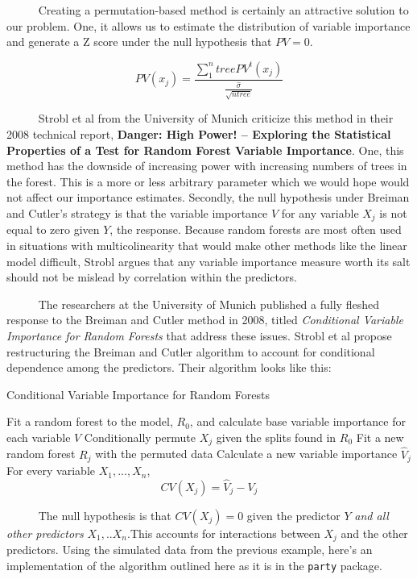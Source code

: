 \documentclass[12pt,twoside]{reedthesis}
\begin{document}
  ~~~~~ Creating a permutation-based method is certainly an attractive
  solution to our problem. One, it allows us to estimate the distribution
  of variable importance and generate a Z score under the null hypothesis
  that \(PV = 0\).
  
  \[PV(x_j) = \frac{\sum_1^ntree PV^t(x_j)}{\frac{\hat{\sigma}}{\sqrt{ntree}}}\]
  
  ~~~~~ Strobl et al from the University of Munich criticize this method
  in their 2008 technical report, \textbf{Danger: High Power! -- Exploring
  the Statistical Properties of a Test for Random Forest Variable
  Importance}. One, this method has the downside of increasing power with
  increasing numbers of trees in the forest. This is a more or less
  arbitrary parameter which we would hope would not affect our importance
  estimates. Secondly, the null hypothesis under Breiman and Cutler's
  strategy is that the variable importance \(V\) for any variable \(X_j\)
  is not equal to zero given \(Y\), the response. Because random forests
  are most often used in situations with multicolinearity that would make
  other methods like the linear model difficult, Strobl argues that any
  variable importance measure worth its salt should not be mislead by
  correlation within the predictors.
  
  ~~~~~ The researchers at the University of Munich published a fully
  fleshed response to the Breiman and Cutler method in 2008, titled
  \emph{Conditional Variable Importance for Random Forests} that address
  these issues. Strobl et al propose restructuring the Breiman and Cutler
  algorithm to account for conditional dependence among the predictors.
  Their algorithm looks like this:
  
  \begin{algorithm}
  \caption{Conditional Variable Importance for Random Forests}
  \label{cviRF}
  \begin{algorithmic}[1]
  \State Fit a random forest to the model, $R_0$, and calculate base variable importance for each variable $V$ 
  \State Conditionally permute $X_j$ given the splits found in $R_0$
  \State Fit a new random forest $R_j$ with the permuted data
  \State Calculate a new variable importance $\hat{V}_j$
  \EndFor
  \State For every variable $X_1,..., X_n$, $$CV(X_j) = \hat{V}_j - V_j$$
  \end{algorithmic}
  \end{algorithm}
  
  ~~~~~ The null hypothesis is that \(CV(X_j) = 0\) given the predictor
  \(Y\) \emph{and all other predictors} \(X_1,..X_n\).This accounts for
  interactions between \(X_j\) and the other predictors. Using the
  simulated data from the previous example, here's an implementation of
  the algorithm outlined here as it is in the \texttt{party} package.
  
\end{document}
